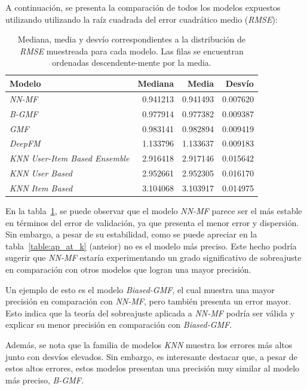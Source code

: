 \documentclass[11pt,a4paper,twoside]{thesis}
\begin{document}
A continuación, se presenta la comparación de todos los modelos expuestos
utilizando utilizando la raíz cuadrada del error cuadrático medio
(\textit{RMSE}):

\begin{table}[!htb]
	\centering
	\footnotesize
	\begin{tabular}{lrrr}
		\hline
		Modelo                                & Mediana  & Media    & Desvío   \\
		\hline
		\textit{NN-MF}                        & 0.941213 & 0.941493 & 0.007620 \\
		\textit{B-GMF}                        & 0.977914 & 0.977382 & 0.009387 \\
		\textit{GMF}                          & 0.983141 & 0.982894 & 0.009419 \\
		\textit{DeepFM}                       & 1.133796 & 1.133637 & 0.009183 \\
		\textit{KNN User-Item Based Ensemble} & 2.916418 & 2.917146 & 0.015642 \\
		\textit{KNN User Based}               & 2.952661 & 2.952305 & 0.016170 \\
		\textit{KNN Item Based}               & 3.104068 & 3.103917 & 0.014975 \\
		\hline
	\end{tabular}
	\caption{
		Mediana, media y desvío correspondientes a la distribución de
		\textit{RMSE} muestreada para cada modelo. Las filas se encuentran ordenadas  descendente-mente por la media.
	}
	\label{table:rmse}
\end{table}

En la tabla~\ref{table:rmse}, se puede observar que el modelo \textit{NN-MF}
parece ser el más estable en términos del error de validación, ya que presenta
el menor error y dispersión. Sin embargo, a pesar de su estabilidad, como se
puede apreciar en la tabla~\ref{table:ap_at_k} (anteior) no es el modelo más
preciso. Este hecho podría sugerir que \textit{NN-MF} estaría experimentando un
grado significativo de sobreajuste en comparación con otros modelos que logran
una mayor precisión.

Un ejemplo de esto es el modelo \textit{Biased-GMF}, el cual muestra una mayor
precisión en comparación con \textit{NN-MF}, pero también presenta un error
mayor. Esto indica que la teoría del sobreajuste aplicada a \textit{NN-MF}
podría ser válida y explicar su menor precisión en comparación con
\textit{Biased-GMF}.

Además, se nota que la familia de modelos \textit{KNN} muestra los errores más
altos junto con desvíos elevados. Sin embargo, es interesante destacar que, a
pesar de estos altos errores, estos modelos presentan una precisión muy similar
al modelo más preciso, \textit{B-GMF}.
\end{document}
